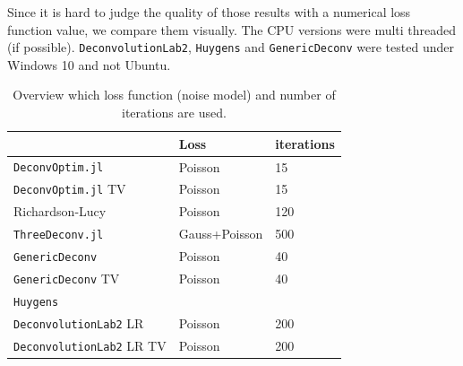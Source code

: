 \documentclass{juliacon}
\begin{document}
        Since it is hard to judge the quality of those results with a numerical loss function value, we compare them visually.
        The CPU versions were multi threaded (if possible). \verb|DeconvolutionLab2|, \verb|Huygens| and \verb|GenericDeconv| were tested under Windows 10 and not Ubuntu.

        \begin{table}[h]
            \begin{tabular}{l l l}
                & Loss & iterations \\ 
            \hline
            \verb|DeconvOptim.jl| & Poisson & 15 \\
            \verb|DeconvOptim.jl| TV & Poisson & 15\\
            Richardson-Lucy & Poisson & 120 \\
            \verb|ThreeDeconv.jl|  & Gauss+Poisson& 500\\
            \verb|GenericDeconv|  & Poisson & 40\\
            \verb|GenericDeconv| TV & Poisson & 40 \\
            \verb|Huygens|  & & \\
            \verb|DeconvolutionLab2| LR & Poisson & 200\\
            \verb|DeconvolutionLab2| LR TV& Poisson & 200 
            \end{tabular}
            \caption{Overview which loss function (noise model) and number of iterations are used.}
            \label{tab:deconvprop}
        \end{table}
\end{document}
